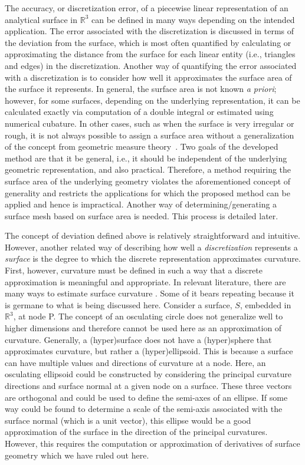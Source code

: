 The accuracy, or discretization error, of a piecewise linear
representation of an analytical surface in ${\mathbb R}^3$ can be
defined in many ways depending on the intended application. The error
associated with the discretization is discussed in terms of the
deviation from the surface, which is most often quantified by calculating 
or approximating the distance from the surface for each linear entity
(i.e., triangles and edges) in the discretization.  Another way of 
quantifying
the error associated with a discretization is to consider how well
it approximates the surface area of the surface it represents.  In
general, the surface area is not known {\it a priori}; however, for some
surfaces, depending on the underlying representation, it can be 
calculated exactly via computation of a double integral or estimated using 
numerical cubature.  In other cases, such as when the surface is very 
irregular or rough, it is not always possible to assign a surface area
without a generalization of the concept from geometric measure 
theory~\cite{gmt}.  Two goals of the developed 
method are that it be general, i.e., it 
should be independent of the underlying geometric representation, and 
also practical.  Therefore, a method requiring the surface area of the 
underlying geometry violates the aforementioned concept of 
generality and restricts the applications for which the proposed method 
can be applied and hence is impractical.  Another way of 
determining/generating a surface mesh based on surface area is needed. 
This process is detailed later.

The concept of deviation defined above is relatively straightforward and
intuitive. However, another related way of describing how well a
\textit{discretization} represents a \textit{surface} is the degree to
which the discrete representation approximates curvature. First,
however, curvature must be defined in such a way that a discrete
approximation is meaningful and appropriate. In relevant literature,
there are many ways to estimate surface curvature \cite{hermann07}. Some
of it bears repeating because it is germane to what is being discussed
here.  Consider a surface, $S$, embedded in ${\mathbb R}^3$, at node P.
The concept of an osculating circle \cite{weissteineOsculatingCircle}
does not generalize well to higher dimensions and therefore cannot be
used here as an approximation of curvature. Generally, a (hyper)surface
does not have a (hyper)sphere that approximates curvature, but rather a
(hyper)ellipsoid. This is because a surface can have multiple values and
directions of curvature at a node. Here, an osculating ellipsoid could
be constructed by considering the principal curvature directions and
surface normal at a given node on a surface. These three vectors are
orthogonal and could be used to define the semi-axes of an ellipse. If
some way could be found to determine a scale of the semi-axis associated
with the surface normal (which is a unit vector), this ellipse would be
a good approximation of the surface in the direction of the principal
curvatures. However, this requires the computation or approximation of
derivatives of surface geometry which we have ruled out here.

